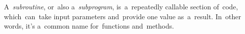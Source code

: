 \label{subroutine}
\mbox{A \textit{subroutine}}, or~also \mbox{a \textit{subprogram},} is~a~repeatedly callable section of~code, which~can~take input parameters and~provide one value as~a~result.
In~other words, it's a~common name for~functions and~methods.
